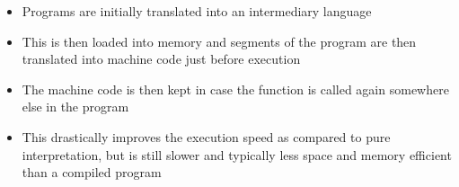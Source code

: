 \begin{itemize}
  \item Programs are initially translated into an intermediary language
  \item This is then loaded into memory and segments of the program are then translated into machine code just before
   execution
  \item The machine code is then kept in case the function is called again somewhere else in the program
  \item This drastically improves the execution speed as compared to pure interpretation, but is still slower and
   typically less space and memory efficient than a compiled program
\end{itemize}